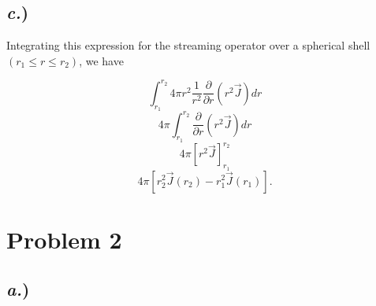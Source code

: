 \documentclass{article}
\newcommand{\p}{\partial}
\newcommand{\cur}{\vec{J}}
\begin{document}
\subsection*{\textit{c.})}

Integrating this expression for the streaming operator over a spherical shell $(r_1 \leq r \leq r_2)$, we have

$$ \int_{r_1}^{r_2} 4 \pi r^2 \frac{1}{r^2} \frac{\p }{\p r} \left( r^2 \cur \right) dr $$
$$ 4 \pi \int_{r_1}^{r_2} \frac{\p }{\p r} \left( r^2 \cur \right) dr $$
$$ 4 \pi \left[ r^2 \cur \right]_{r_1}^{r_2} $$
$$\boxed{ 4 \pi \left[ r_2^2 \cur(r_2) - r_1^2 \cur(r_1) \right] }.$$




\section*{Problem 2}

\subsection*{\textit{a.})}
\end{document}
